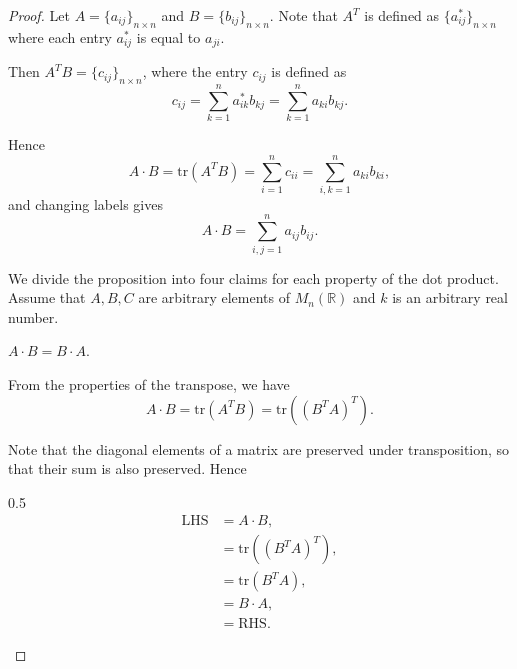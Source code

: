 \begin{enumerate}
\begin{enumerate}
\begin{proof}
                    \smallskip

                    Let $A = \{a_{ij}\}_{n \times n}$ and $B = \{b_{ij}\}_{n \times n}$.
                    Note that $A^T$ is defined as $\{a^*_{ij}\}_{n \times n}$ where each entry $a^*_{ij}$ is equal to $a_{ji}$.

                    Then $A^T B = \{c_{ij}\}_{n \times n}$, where the entry $c_{ij}$ is defined as
                    \[
                        c_{ij} = \sum_{k = 1}^n a^*_{ik} b_{kj} = \sum_{k = 1}^n a_{ki} b_{kj}.
                    \]

                    Hence
                    \[
                        A \cdot B = \text{tr}(A^T B) = \sum_{i = 1}^n c_{ii} = \sum_{i, k = 1}^n a_{ki} b_{ki},
                    \]
                    and changing labels gives
                    \begin{equation} \label{eq:dot-product}
                        A \cdot B = \sum_{i, j = 1}^n a_{ij} b_{ij}.
                    \end{equation}

                    \smallskip

                    We divide the proposition into four claims for each property of the dot product.
                    Assume that $A, B, C$ are arbitrary elements of $M_n(\mathbb{R})$ and $k$ is an arbitrary real number.

                    \smallskip

                    \begin{claim}
                        $A \cdot B = B \cdot A$.
                    \end{claim}

                    \begin{subproof}
                        From the properties of the transpose, we have
                        \[
                            A \cdot B = \text{tr}(A^T B) = \text{tr}\left((B^T A)^T\right).
                        \]

                        Note that the diagonal elements of a matrix are preserved under transposition, so that their sum is also preserved.
                        Hence
                        \begin{spreadlines}{0.5\baselineskip}
                            \begin{align*}
                                \text{LHS} &= A \cdot B, \\
                                &= \text{tr}\left((B^T A)^T\right), \\
                                &= \text{tr}(B^T A), \\
                                &= B \cdot A, \\
                                &= \text{RHS}.
                            \end{align*}
                        \end{spreadlines}
                    \end{subproof}


\end{proof}
\end{enumerate}
\end{enumerate}
